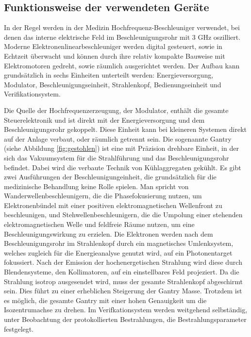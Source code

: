 





\subsection{Funktionsweise der verwendeten Geräte}
In der Regel werden in der Medizin Hochfrequenz-Beschleuniger verwendet, bei denen das interne elektrische Feld 
im Beschleunigungsrohr mit 3 GHz oszilliert. 
Moderne Elektronenlinearbeschleuniger werden digital gesteuert, sowie in Echtzeit überwacht und können durch ihre relativ kompakte Bauweise
mit Elektromotoren gedreht, sowie räumlich ausgerichtet werden.
Der Aufbau kann grundsätzlich in sechs Einheiten unterteilt werden: Energieversorgung, Modulator, Beschleunigungseinheit, Strahlenkopf, Bedienungseinheit und Verifikationsystem. \cite{KriegerHannoSfTu}


Die Quelle der Hochfrequenzerzeugung, der Modulator, enthält die gesamte Steuerelektronik und ist direkt mit der Energieversorgung und dem Beschleunigungsrohr gekoppelt.
Diese Einheit kann bei kleineren Systemen direkt auf der Anlage verbaut, oder räumlich getrennt sein.
Die sogenannte Gantry (siehe Abbildung \ref{fig:gestohlen}) ist eine mit Präzision drehbare Einheit, in der sich das Vakuumsystem für die Strahlführung und das Beschleunigungsrohr befindet.
Dabei wird die verbaute Technik von Kühlaggregaten gekühlt.
Es gibt zwei Ausführungen der Beschleunigungeinheit, die grundsätzlich für die medizinische Behandlung keine Rolle spielen.
Man spricht von Wanderwellenbeschleunigern, die die Phasefokusierung nutzen, um Elektronenbündel mit einer positiven elektromagnetischen Wellenfront zu beschleunigen,
und Stehwellenbeschleunigern, die die Umpolung einer stehenden elektromagnetischen Welle und feldfreie Räume nutzen, um eine Beschleunigungswirkung zu erzielen.
Die Elektronen werden nach dem Beschleunigungsrohr im Strahlenkopf durch ein magnetisches Umlenksystem, welches zugleich für die Energieanalyse genutzt wird, auf ein Photonentarget fokussiert.
Nach der Emission der hochenergetischen Strahlung wird diese durch Blendensysteme, den Kollimatoren, auf ein einstellbares Feld projeziert.
Da die Strahlung isotrop ausgesendet wird, muss der gesamte Strahlenkopf abgeschirmt sein. Dies führt zu einer erheblichen Steigerung der Gantry Masse.
Trotzdem ist es möglich, die gesamte Gantry mit einer hohen Genauigkeit um die Isozentrumachse zu drehen.
Im Verifkationsystem werden weitgehend selbständig, unter Beobachtung der protokollierten Bestrahlungen, die Bestrahlungsparameter festgelegt.\cite{KriegerHannoSfTu}

